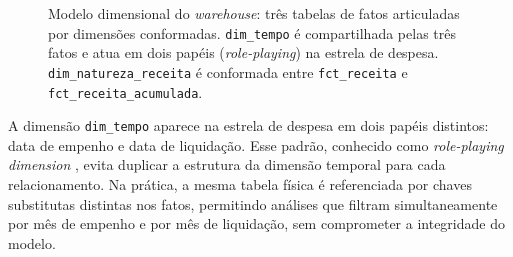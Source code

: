 \begin{figure}[ht]
{
}
\caption{Modelo dimensional do \textit{warehouse}: três tabelas de fatos articuladas por dimensões conformadas. \texttt{dim\_tempo} é compartilhada pelas três fatos e atua em dois papéis (\textit{role-playing}) na estrela de despesa. \texttt{dim\_natureza\_receita} é conformada entre \texttt{fct\_receita} e \texttt{fct\_receita\_acumulada}.}
\label{fig:estrelas}
\end{figure}

A dimensão \texttt{dim\_tempo} aparece na estrela de despesa em dois papéis distintos: data de empenho e data de liquidação. Esse padrão, conhecido como \textit{role-playing dimension} \cite{kimball2013data}, evita duplicar a estrutura da dimensão temporal para cada relacionamento. Na prática, a mesma tabela física é referenciada por chaves substitutas distintas nos fatos, permitindo análises que filtram simultaneamente por mês de empenho e por mês de liquidação, sem comprometer a integridade do modelo.

